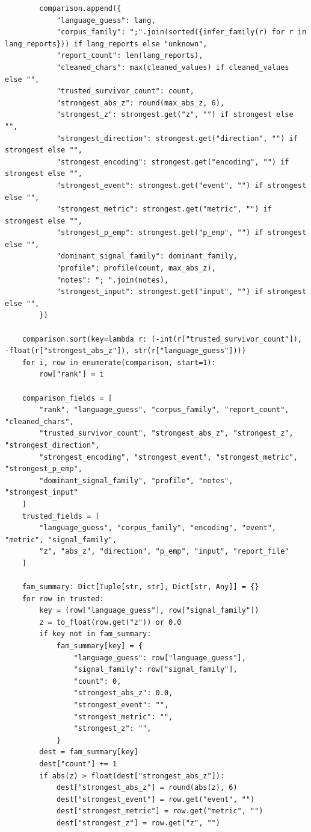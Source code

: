 \documentclass[11pt,a4paper]{article}
\begin{document}
\begin{lstlisting}
        comparison.append({
            "language_guess": lang,
            "corpus_family": ";".join(sorted({infer_family(r) for r in lang_reports})) if lang_reports else "unknown",
            "report_count": len(lang_reports),
            "cleaned_chars": max(cleaned_values) if cleaned_values else "",
            "trusted_survivor_count": count,
            "strongest_abs_z": round(max_abs_z, 6),
            "strongest_z": strongest.get("z", "") if strongest else "",
            "strongest_direction": strongest.get("direction", "") if strongest else "",
            "strongest_encoding": strongest.get("encoding", "") if strongest else "",
            "strongest_event": strongest.get("event", "") if strongest else "",
            "strongest_metric": strongest.get("metric", "") if strongest else "",
            "strongest_p_emp": strongest.get("p_emp", "") if strongest else "",
            "dominant_signal_family": dominant_family,
            "profile": profile(count, max_abs_z),
            "notes": "; ".join(notes),
            "strongest_input": strongest.get("input", "") if strongest else "",
        })

    comparison.sort(key=lambda r: (-int(r["trusted_survivor_count"]), -float(r["strongest_abs_z"]), str(r["language_guess"])))
    for i, row in enumerate(comparison, start=1):
        row["rank"] = i

    comparison_fields = [
        "rank", "language_guess", "corpus_family", "report_count", "cleaned_chars",
        "trusted_survivor_count", "strongest_abs_z", "strongest_z", "strongest_direction",
        "strongest_encoding", "strongest_event", "strongest_metric", "strongest_p_emp",
        "dominant_signal_family", "profile", "notes", "strongest_input"
    ]
    trusted_fields = [
        "language_guess", "corpus_family", "encoding", "event", "metric", "signal_family",
        "z", "abs_z", "direction", "p_emp", "input", "report_file"
    ]

    fam_summary: Dict[Tuple[str, str], Dict[str, Any]] = {}
    for row in trusted:
        key = (row["language_guess"], row["signal_family"])
        z = to_float(row.get("z")) or 0.0
        if key not in fam_summary:
            fam_summary[key] = {
                "language_guess": row["language_guess"],
                "signal_family": row["signal_family"],
                "count": 0,
                "strongest_abs_z": 0.0,
                "strongest_event": "",
                "strongest_metric": "",
                "strongest_z": "",
            }
        dest = fam_summary[key]
        dest["count"] += 1
        if abs(z) > float(dest["strongest_abs_z"]):
            dest["strongest_abs_z"] = round(abs(z), 6)
            dest["strongest_event"] = row.get("event", "")
            dest["strongest_metric"] = row.get("metric", "")
            dest["strongest_z"] = row.get("z", "")


\end{lstlisting}
\end{document}
